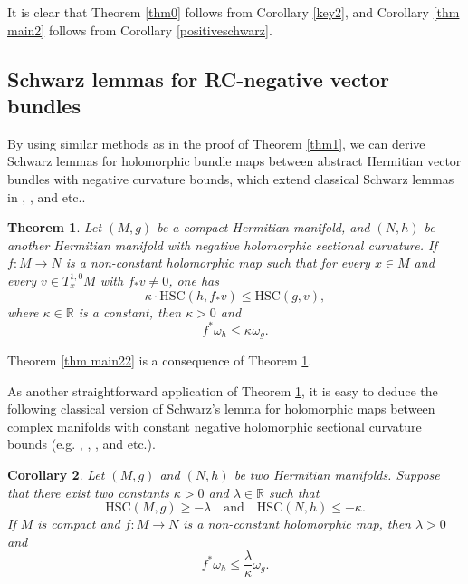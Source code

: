 \documentclass[12pt]{amsart}
\theoremstyle{plain}
\newtheorem{thm}{Theorem}[section]
\newtheorem{cor}[thm]{Corollary}
\theoremstyle{definition}
\newcommand{\btheorem}{\begin{thm}}
\newcommand{\etheorem}{\end{thm}}
\newcommand{\bcorollary}{\begin{cor}}
\newcommand{\ecorollary}{\end{cor}}
\newcommand{\beq}{\begin{equation}}
\newcommand{\eeq}{\end{equation}}
\newcommand{\qtq}[1]{\quad\mbox{#1}\quad}
\renewcommand{\>}{\rightarrow}
\newcommand{\R}{{\mathbb R}}
\newcommand{\om}{\omega}
\numberwithin{equation}{section} %
\begin{document}
 \noindent
It is clear that Theorem \ref{thm0} follows from Corollary \ref{key2},  and  Corollary  \ref{thm main2} follows from Corollary \ref{positiveschwarz}.




\baselineskip




\subsection{Schwarz  lemmas for RC-negative vector bundles} By using similar methods as in the proof of Theorem \ref{thm1}, we can derive Schwarz lemmas for holomorphic bundle maps between abstract  Hermitian vector bundles with negative curvature bounds, which extend classical Schwarz lemmas in \cite{Yau78}, \cite{CCL79}, \cite{Roy80} and etc..


 \btheorem\label{negativeschwarz}
Let $(M,g)$ be a compact Hermitian manifold,
and $(N,h)$ be another Hermitian manifold with negative holomorphic sectional curvature.
If $f:M\to N$ is a non-constant holomorphic map such that for every $x\in M$ and every $v\in T_x^{1,0}M$ with $f_*v\neq 0$,  one has
\beq \kappa\cdot
\mathrm{HSC}\left(h, f_*v\right)\le \mathrm{HSC}\left(g, v\right), \label{negativeHSC}
\eeq
where  $\kappa\in \R$ is a constant,  then  $\kappa>0$ and
\beq
f^*\om_h\le \kappa^{} \om_g.
\eeq
\etheorem



\baselineskip

\noindent Theorem \ref{thm main22} is a consequence of Theorem \ref{negativeschwarz}.








\baselineskip

\noindent
As another straightforward  application of Theorem \ref{negativeschwarz},   it is easy to deduce the following classical version of Schwarz's lemma for holomorphic maps between complex manifolds with constant negative holomorphic sectional curvature bounds (e.g. \cite{CCL79}, \cite{Roy80}, \cite{Ni19}, \cite{Bro22} and etc.).

\bcorollary Let $(M,g)$
and $(N,h)$ be two Hermitian manifolds.
Suppose that  there exist two constants $\kappa>0$ and  $\lambda\in \R$ such that
\beq
\mathrm{HSC}(M,g)\ge-\lambda\qtq{and} \mathrm{HSC}(N, h)\le -\kappa.
\eeq  If $M$ is compact and $f:M\>N$ is a non-constant holomorphic map,  then $\lambda >0$ and
\beq
f^*\omega_h\le \frac{\lambda}{\kappa}\omega_g.
\eeq
\ecorollary
\end{document}
